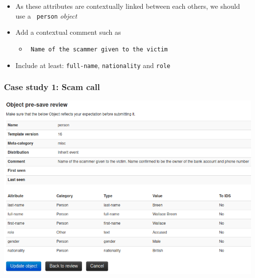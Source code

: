 \begin{frame}
    \begin{itemize}
        \item As these attributes are contextually linked between each others, we should use a \texttt{\color{black} person} \textit{object}
        \item Add a contextual comment such as
        \begin{itemize}
            \item \texttt{\color{black} Name of the scammer given to the victim}
        \end{itemize}
        \item Include at least: \texttt{full-name}, \texttt{nationality} and \texttt{role}
    \end{itemize}
\end{frame}

\begin{frame}
    \frametitle{Case study 1: Scam call}
    \begin{center}
        \includegraphics[width=0.95\linewidth]{pictures/case1/object-person.png}
    \end{center}
\end{frame}

